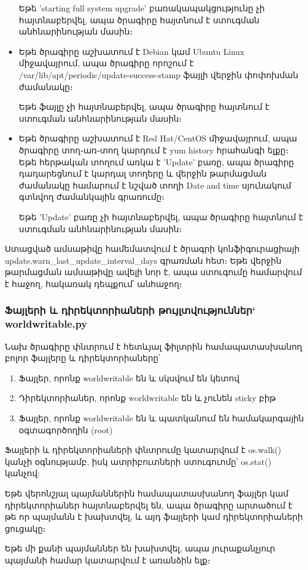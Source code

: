\documentclass[12pt]{article}
\begin{document}
\begin{sloppypar}
\begin{itemize}
	Եթե 'starting full system upgrade' բառակապակցությունը չի հայտնաբերվել,
	ապա ծրագիրը հայտնում է ստուգման անհնարինության մասին։
\item Եթե ծրագիրը աշխատում է Debian կամ Ubuntu Linux միջավայրում, ապա ծրագիրը
	որոշում է /var/lib/apt/periodic/update-success-stamp ֆայլի վերջին փոփոխման
	ժամանակը։

	Եթե ֆայլը չի հայտնաբերվել, ապա ծրագիրը հայտնում է ստուգման անհնարինության
	մասին։
\item Եթե ծրագիրը աշխատում է Red Hat/CentOS միջավայրում, ապա ծրագիրը տող֊առ֊տող
    կարդում է yum history հրահանգի ելքը։ Եթե հերթական տողում առկա է
	'Update' բառը, ապա ծրագիրը դադարեցնում
	է կարդալ տողերը և վերջին թարմացման ժամանակը համարում է նշված տողի 
	Date and time սյունակում գտնվող ժամանկային գրառումը։

	Եթե 'Update' բառը չի հայտնաբերվել, ապա ծրագիրը հայտնում է ստուգման անհնարինության մասին։
\end{itemize}

Ստացված ամսաթիվը համեմատվում է ծրագրի կոնֆիգուրացիայի
update.warn\_last\_update\_interval\_days
գրառման հետ։ Եթե վերջին թարմացման ամսաթիվը ավելի նոր է,
ապա ստուգումը համարվում է հաջող, հակառակ դեպքում՝ անհաջող։


\subsubsection{Ֆայլերի և դիրեկտորիաների թույլտվություններ` worldwritable.py}


Նախ ծրագիրը փնտրում է հետևյալ ֆիլտրին համապատասխանող բոլոր ֆայլերը և դիրեկտորիաները՝

\begin{enumerate}
\item Ֆայլեր, որոնք worldwritable են և սկսվում են կետով
\item Դիրեկտորիաներ, որոնք worldwritable են և չունեն sticky բիթ
\item Ֆայլեր, որոնք worldwritable են և պատկանում են համակարգային օգտագործողին (root)
\end{enumerate}

Ֆայլերի և դիրեկտորիաների փնտրումը կատարվում է os.walk() կանչի օգնությամբ,
իսկ ատրիբուտների ստուգուոմը՝ os.stat() կանչով:

Եթե վերոնշյալ պայմաններին համապատասխանող ֆայլեր կամ դիրեկտորիաներ հայտնաբերվել են,
ապա ծրագիրը արտածում է թե որ պայմանն է խախտվել, և այդ ֆայլերի կամ դիրեկտորիաների
ցուցակը։

Եթե մի քանի պայմաններ են խախտվել, ապա յուրաքանչյուր պայմանի համար կատարվում է
առանձին ելք։



\end{sloppypar}
\end{document}
